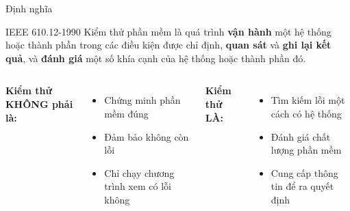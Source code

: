 \documentclass[aspectratio=169,12pt]{beamer}
\begin{document}
\begin{frame}{Định nghĩa}
  \begin{block}{IEEE 610.12-1990}
    Kiểm thử phần mềm là quá trình \textbf{vận hành} một hệ thống hoặc thành phần
    trong các điều kiện được chỉ định, \textbf{quan sát} và \textbf{ghi lại kết quả},
    và \textbf{đánh giá} một số khía cạnh của hệ thống hoặc thành phần đó.
  \end{block}

  \vspace{0.8em}
  \begin{columns}
    \textbf{Kiểm thử KHÔNG phải là:}
    \begin{itemize}
      \item Chứng minh phần mềm đúng
      \item Đảm bảo không còn lỗi
      \item Chỉ chạy chương trình xem có lỗi không
    \end{itemize}

    \textbf{Kiểm thử LÀ:}
    \begin{itemize}
      \item Tìm kiếm lỗi một cách có hệ thống
      \item Đánh giá chất lượng phần mềm
      \item Cung cấp thông tin để ra quyết định
    \end{itemize}
  \end{columns}
\end{frame}
\end{document}

